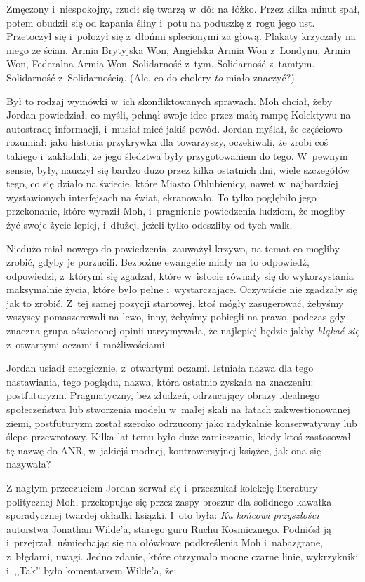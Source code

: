 \documentclass[oneside,polish,11pt,sfheadings]{mwbk}
\begin{document}
Zmęczony i~niespokojny, rzucił się twarzą w~dół na łóżko. Przez kilka
minut spał, potem obudził się od kapania śliny i~potu na poduszkę z~rogu
jego ust. Przetoczył się i~położył się z~dłońmi splecionymi za głową.
Plakaty krzyczały na niego ze ścian. Armia Brytyjska Won, Angielska
Armia Won z~Londynu, Armia Won, Federalna Armia Won. Solidarność z~tym.
Solidarność z~tamtym. Solidarność z~Solidarnością. (Ale, co do cholery
\emph{to} miało znaczyć?)

Był to rodzaj wymówki w~ich skonfliktowanych sprawach. Moh chciał, żeby
Jordan powiedział, co myśli, pchnął swoje idee przez małą rampę
Kolektywu na autostradę informacji, i~musiał mieć jakiś powód. Jordan
myślał, że częściowo rozumiał: jako historia przykrywka dla towarzyszy,
oczekiwali, że zrobi coś takiego i~zakładali, że jego śledztwa były
przygotowaniem do tego. W~pewnym sensie, były, nauczył się bardzo dużo
przez kilka ostatnich dni, wiele szczegółów tego, co się działo na
świecie, które Miasto Oblubienicy, nawet w~najbardziej wystawionych
interfejsach na świat, ekranowało. To tylko pogłębiło jego przekonanie,
które wyraził Moh, i~pragnienie powiedzenia ludziom, że mogliby żyć
swoje życie lepiej, i~dłużej, jeżeli tylko odeszliby od tych walk.

Niedużo miał nowego do powiedzenia, zauważył krzywo, na temat co mogliby
zrobić, gdyby je porzucili. Bezbożne ewangelie miały na to odpowiedź,
odpowiedzi, z~którymi się zgadzał, które w~istocie równały się do
wykorzystania maksymalnie życia, które było pełne i~wystarczające.
Oczywiście nie zgadzały się jak to zrobić. Z~tej samej pozycji
startowej, ktoś mógły zasugerować, żebyśmy wszyscy pomaszerowali na
lewo, inny, żebyśmy pobiegli na prawo, podczas gdy znaczna grupa
oświeconej opinii utrzymywała, że najlepiej będzie jakby \emph{błąkać
się} z~otwartymi oczami i~możliwościami.

Jordan usiadł energicznie, z~otwartymi oczami. Istniała nazwa dla tego
nastawiania, tego poglądu, nazwa, która ostatnio zyskała na znaczeniu:
postfuturyzm. Pragmatyczny, bez złudzeń, odrzucający obrazy idealnego
społeczeństwa lub stworzenia modelu w~małej skali na łatach
zakwestionowanej ziemi, postfuturyzm został szeroko odrzucony jako
radykalnie konserwatywny lub ślepo przewrotowy. Kilka lat temu było duże
zamieszanie, kiedy ktoś zastosował tę nazwę do ANR, w~jakiejś modnej,
kontrowersyjnej książce, jak ona się nazywała?

Z nagłym przeczuciem Jordan zerwał się i~przeszukał kolekcję literatury
politycznej Moh, przekopując się przez zaspy broszur dla solidnego
kawałka sporadycznej twardej okładki książki. I~oto była: \emph{Ku
końcowi przyszłości} autorstwa Jonathan Wilde'a, starego guru Ruchu
Kosmicznego. Podniósł ją i~przejrzał, uśmiechając się na ołówkowe
podkreślenia Moh i~nabazgrane, z~błędami, uwagi. Jedno zdanie, które
otrzymało mocne czarne linie, wykrzykniki i~,,Tak'' było komentarzem
Wilde'a, że:
\end{document}

